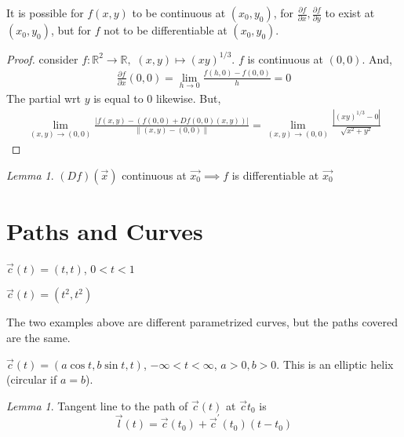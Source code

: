 \documentclass[12pt]{book}
\theoremstyle{definition}
\theoremstyle{remark}
\newtheorem{lemma}[theorem]{Lemma}
\begin{document}
    \begin{example}It is possible for $f(x,y)$ to be continuous at $(x_0, y_0)$, for $\frac{\partial f}{\partial x} , \frac{\partial f}{ \partial y } $ to exist at $(x_0, y_0)$, but for $f$ not to be differentiable at $(x_0, y_0)$. 
      \begin{proof} 
        consider $f: \mathbb{R}^2 \rightarrow \mathbb{R},$ $(x,y) \mapsto (xy)^{1/3} $. $f$ is continuous at $(0,0)$. And, 
        \begin{equation*}
          \begin{split}
            \frac{\partial f}{\partial x} (0,0) = \lim_{h \rightarrow 0}\frac{f(h,0)- f(0,0)}{h} =0
          \end{split}
        \end{equation*}
        The partial wrt $y$ is equal to 0 likewise.  But, 
        \begin{equation*}
          \begin{split}
            \lim_{(x,y) \rightarrow (0,0)} \frac{|f(x,y) - (f(0,0)+ Df(0,0)(x,y))|}{\| (x,y)-(0,0) \|} =   \lim_{(x,y) \rightarrow (0,0)} \frac{|(xy)^{1/3} - 0 |}{\sqrt{x^2 + y^2}} 
          \end{split}
        \end{equation*}
      \end{proof}
    \end{example}
    \begin{lemma} $(Df)(\vec{{x}} )$ continuous at $\vec{{x_0}}\implies f$ is differentiable at $\vec{{x_0}} $ 
    \end{lemma}
    \section{ Paths and Curves }
    \begin{example}
      $\vec{{c}} (t) = (t,t)$, $0<t<1$      
    \end{example}
    \begin{example}
      $\vec{{c}} (t) = (t^2, t^2)$
    \end{example}
    The two examples above are different parametrized curves, but the paths covered are the same. 
    \begin{example}
      $\vec{{c}} (t) = (a \cos t , b \sin t , t)$, $- \infty < t < \infty$, $ a > 0, b> 0 $. This is an elliptic helix (circular if $a = b$). 
    \end{example}
    \begin{lemma} 
      Tangent line to the path of $\vec{{c}} (t)$ at $\vec{{c}} t_0$ is $$\vec{{l}} (t) = \vec{{c}} (t_0)+ \vec{{c}}^\prime (t_0)(t-t_0) $$ 

    \end{lemma}
\end{document}
